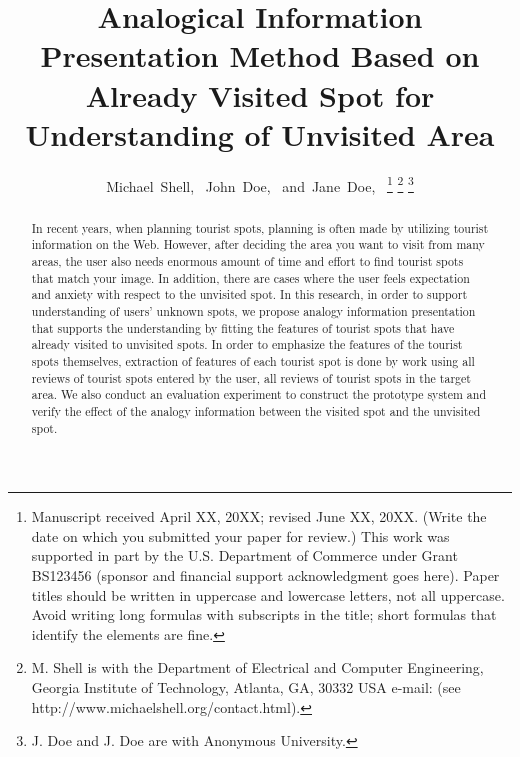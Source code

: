 \documentclass[journal]{IAENGtran}
\begin{document}
%
\title{Analogical Information Presentation Method Based on Already Visited Spot for Understanding of Unvisited Area}
%
%
%

\author{Michael~Shell,~
        John~Doe,~
        and~Jane~Doe,~%
\thanks{Manuscript received April XX, 20XX; revised June XX, 20XX. (Write the date on
which you submitted your paper for review.) This work was supported
in part by the U.S. Department of Commerce under Grant BS123456
(sponsor and financial support acknowledgment goes here). Paper
titles should be written in uppercase and lowercase letters, not all
uppercase. Avoid writing long formulas with subscripts in the title;
short formulas that identify the elements are fine.}
\thanks{M. Shell is with the Department
of Electrical and Computer Engineering, Georgia Institute of
Technology, Atlanta,
GA, 30332 USA e-mail: (see http://www.michaelshell.org/contact.html).}%
\thanks{J. Doe and J. Doe are with Anonymous University.}}%


\maketitle

\pagestyle{empty}
\thispagestyle{empty}

\begin{abstract}
In recent years, when planning tourist spots, planning is often made by utilizing tourist information on the Web. However, after deciding the area you want to visit from many areas, the user also needs enormous amount of time and effort to find tourist spots that match your image. In addition, there are cases where the user feels expectation and anxiety with respect to the unvisited spot. In this research, in order to support understanding of users' unknown spots, we propose analogy information presentation that supports the understanding by fitting the features of tourist spots that have already visited to unvisited spots. In order to emphasize the features of the tourist spots themselves, extraction of features of each tourist spot is done by work using all reviews of tourist spots entered by the user, all reviews of tourist spots in the target area. We also conduct an evaluation experiment to construct the prototype system and verify the effect of the analogy information between the visited spot and the unvisited spot.
\end{abstract}
\end{document}
